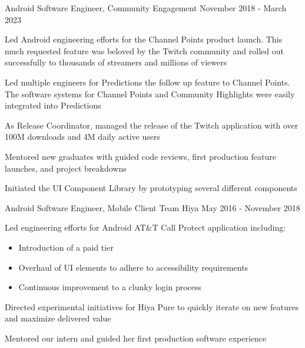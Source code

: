 \begin{cventries}
  \cventry
    {Android Software Engineer, Community Engagement} %
    {} %
    {} %
    {November 2018 - March 2023} %
    {
    \begin{cvitems} %
    \item Led Android engineering efforts for the Channel Points product launch. This much requested feature was beloved by the Twitch community and rolled out successfully to thousands of streamers and millions of viewers 
    \item Led multiple engineers for Predictions the follow up feature to Channel Points. The software systems for Channel Points and Community Highlights were easily integrated into Predictions
    \item As Release Coordinator, managed the release of the Twitch application with over 100M downloads and 4M daily active users
    \item Mentored new graduates with guided code reviews, first production feature launches, and project breakdowns
    \item Initiated the UI Component Library by prototyping several different components
    \end{cvitems}
    }

 \cventry
    {Android Software Engineer, Mobile Client Team} %
    {Hiya} %
    {} %
    {May 2016 - November 2018} %
    {
    \begin{cvitems} %
    \item { Led engineering efforts for Android AT\&T Call Protect application including:
        \begin{itemize}
            \item Introduction of a paid tier
            \item Overhaul of UI elements to adhere to accessibility requirements
            \item Continuous improvement to a clunky login process
        \end{itemize}}
    \item Directed experimental initiatives for Hiya Pure to quickly iterate on new features and maximize delivered value
    \item Mentored our intern and guided her first production software experience
    \end{cvitems}
    }


\end{cventries}
